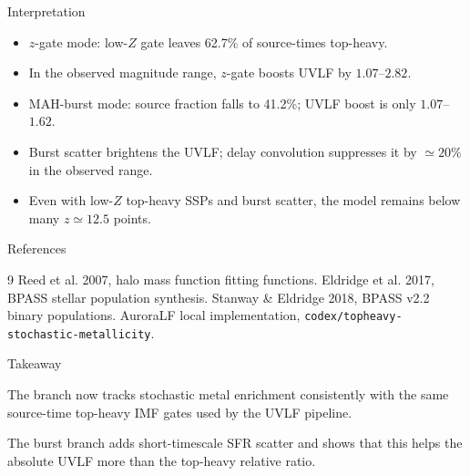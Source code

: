 \documentclass[aspectratio=169,10pt]{beamer}
\newcommand{\HL}[1]{\textcolor{emphasis}{#1}}
\begin{document}
\begin{frame}{Interpretation}
\begin{itemize}
\item \HL{$z$-gate mode}: low-$Z$ gate leaves 62.7\% of source-times top-heavy.
\item In the observed magnitude range, $z$-gate boosts UVLF by $1.07$--$2.82$.
\item \HL{MAH-burst mode}: source fraction falls to 41.2\%; UVLF boost is only $1.07$--$1.62$.
\item Burst scatter brightens the UVLF; delay convolution suppresses it by $\simeq20\%$ in the observed range.
\item Even with low-$Z$ top-heavy SSPs and burst scatter, the model remains below many $z\simeq12.5$ points.
\end{itemize}
\end{frame}

\begin{frame}{References}
\small
\begin{thebibliography}{9}
 Reed et al. 2007, halo mass function fitting functions.
 Eldridge et al. 2017, BPASS stellar population synthesis.
 Stanway \& Eldridge 2018, BPASS v2.2 binary populations.
 AuroraLF local implementation, \texttt{codex/topheavy-stochastic-metallicity}.
\end{thebibliography}
\end{frame}

\begin{frame}{Takeaway}
\begin{center}
\Large
The branch now tracks stochastic metal enrichment consistently with the same source-time top-heavy IMF gates used by the UVLF pipeline.

\vspace{4mm}
The burst branch adds short-timescale SFR scatter and shows that this helps the absolute UVLF more than the top-heavy relative ratio.
\end{center}
\end{frame}
\end{document}
